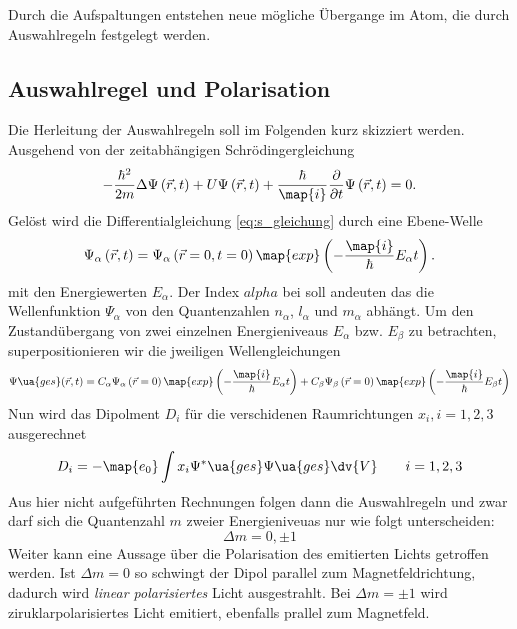 Durch die Aufspaltungen entstehen neue mögliche Übergange im Atom, die durch Auswahlregeln festgelegt werden.

\subsection{Auswahlregel und Polarisation}
Die Herleitung der Auswahlregeln soll im Folgenden kurz skizziert werden.
Ausgehend von der zeitabhängigen Schrödingergleichung
\begin{equation}
  \label{eq:s_gleichung}
  -\frac{\hbar^2}{2m}\Delta \Psi\left(\vec{r},t\right) + U  \Psi\left(\vec{r},t\right) + \frac{\hbar}{\map{i}} \frac{\partial}{\partial t}  \Psi\left(\vec{r},t\right)=0.
\end{equation}
Gelöst wird die Differentialgleichung \eqref{eq:s_gleichung} durch eine Ebene-Welle
\begin{equation*}
  \Psi_{\alpha}\left(\vec{r},t\right)=\Psi_{\alpha}\left(\vec{r}=0,t=0\right)\map{exp}\left(-\frac{\map{i}}{\hbar}E_\alpha t\right).
\end{equation*}
mit den Energiewerten $E_\alpha$. Der Index $alpha$ bei soll andeuten das die Wellenfunktion
$\Psi_\alpha$ von den Quantenzahlen $n_\alpha$, $l_\alpha$ und $m_\alpha$ abhängt.
Um den Zustandübergang von zwei einzelnen Energieniveaus $E_\alpha$ bzw. $E_\beta$ zu betrachten,
superpositionieren wir die jweiligen Wellengleichungen
\begin{equation*}
    \Psi\ua{ges}(\vec{r},t)=C_\alpha\Psi_{\alpha}\left(\vec{r}=0\right)\map{exp}\left(-\frac{\map{i}}{\hbar}E_\alpha t\right)+C_\beta\Psi_{\beta}\left(\vec{r}=0\right)\map{exp}\left(-\frac{\map{i}}{\hbar}E_\beta t\right)
\end{equation*}
Nun wird das Dipolment $D_i$ für die verschidenen Raumrichtungen $x_i, i=1,2,3$ ausgerechnet
\begin{equation*}
  D_i=-\map{e_0}\int x_i \Psi^*\ua{ges}\Psi\ua{ges} \dv{V} \qquad i=1,2,3
\end{equation*}
Aus hier nicht aufgeführten Rechnungen folgen dann die Auswahlregeln und zwar darf sich die Quantenzahl $m$ zweier Energieniveuas
nur wie folgt unterscheiden:
\begin{equation}
  \label{eq:auswahlregeln}
  \Delta m=0 , \pm 1
\end{equation}
Weiter kann eine Aussage über die Polarisation des emitierten Lichts getroffen werden.
Ist $\Delta m=0$ so schwingt der Dipol parallel zum Magnetfeldrichtung, dadurch wird \emph{linear polarisiertes} Licht
ausgestrahlt. Bei $\Delta m=\pm 1$ wird ziruklarpolarisiertes Licht emitiert, ebenfalls prallel zum Magnetfeld.

